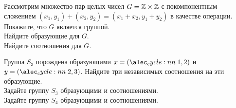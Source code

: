 \documentclass[a4paper,12pt]{article}
\begin{document}
    \problem Рассмотрим множество пар целых чисел $G = \mathbb{Z} \times \mathbb{Z}$ с покомпонентным сложением $(x_1, y_1) + (x_2, y_2) = (x_1 + x_2, y_1 + y_2)$ в качестве операции. \\
    \sub Покажите, что $G$ является группой. \\
    \sub Найдите образующие для $G$. \\
    \sub Найдите соотношения для $G$.
    
    \problem \sub Группа $S_3$ порождена образующими $x = \cycle{1,2}$ и $y = \cycle{2,3}$. Найдите три независимых соотношения на эти образующие. \\
     Задайте группу $S_3$ образующими и соотношениями. \\
     Задайте группу $S_4$ образующими и соотношениями.
\end{document}

